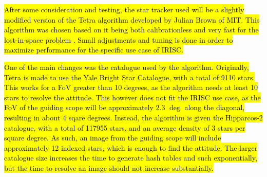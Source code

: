 \hl{After some consideration and testing, the star tracker used will be a slightly modified version of the Tetra algorithm developed by Julian Brown of MIT. This algorithm was chosen based on it being both calibrationless and very fast for the lost-in-space problem \mbox{\cite{tetra}}. Small adjustments and tuning is done in order to maximize performance for the specific use case of IRISC.}

\hl{One of the main changes was the catalogue used by the algorithm. Originally, Tetra is made to use the Yale Bright Star Catalogue, with a total of 9110 stars. This works for a FoV greater than 10 degrees, as the algorithm needs at least 10 stars to resolve the attitude. This however does not fit the IRISC use case, as the FoV of the guiding scope will be approximately 2.3 $\deg$ along the diagonal, resulting in about 4 sqare degrees. Instead, the algorithm is given the Hipparcos-2 catalogue, with a total of 117955 stars, and an average density of 3 stars per square degree. As such, an image from the guiding scope will include approximately 12 indexed stars, which is enough to find the attitude. The larger catalogue size increases the time to generate hash tables and such exponentially, but the time to resolve an image should not increase substantially.}
















































\raggedbottom
